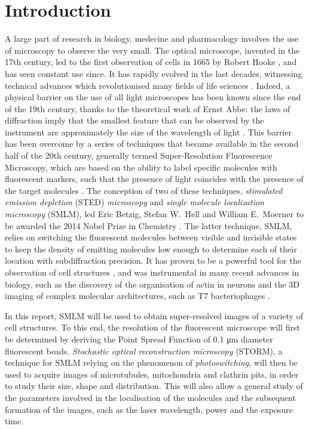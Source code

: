 \section{Introduction}
A large part of research in biology, medecine and pharmacology involves the use of microscopy to observe the very small.
The optical microscope, invented in the 17th century, led to the first observation of cells in 1665 by Robert Hooke \cite{reigoto_comparative_2021}, and has seen constant use since.
It has rapidly evolved in the last decades, witnessing technical advances which revolutionised many fields of life sciences \cite{balasubramanian_imagining_2023}.
Indeed, a physical barrier on the use of all light microscopes has been known since the end of the 19th century, thanks to the theoretical work of Ernst Abbe: the laws of diffraction imply that the smallest feature that can be observed by the instrument are approximately the size of the wavelength of light \cite{diaspro_fundamentals_2011}.
This barrier has been overcome by a series of techniques that became available in the second half of the 20th century, generally termed Super-Resolution Fluorescence Microscopy, which are based on the ability to label specific molecules with fluorescent markers, such that the presence of light coincides with the presence of the target molecules \cite{douglass_notice_2023}.
The conception of two of these techniques, \emph{stimulated emission depletion} (STED) \emph{microscopy} and \emph{single molecule localization microscopy} (SMLM), led Eric Betzig, Stefan W.~Hell and William E.~Moerner to be awarded the 2014 Nobel Prize in Chemistry \cite{nobel_press_2014}.
The latter technique, SMLM, relies on switching the fluorescent molecules between visible and invisible states to keep the density of emitting molecules low enough to determine each of their location with subdiffraction precision.
It has proven to be a powerful tool for the observation of cell structures \cite{baddeley_biological_2018}, 
and was instrumental in many recent advances in biology, such as the discovery of the organisation of actin in neurons \cite{xu_actin_2013} and the 3D imaging of complex molecular architectures, such as T7 bacteriophages \cite{huang_ultra-high_2016}.

In this report, SMLM will be used to obtain super-resolved images of a variety of cell structures.
To this end, the resolution of the fluorescent microscope will first be determined by deriving the Point Spread Function of 0.1 \unit{\micro m} diameter fluorescent beads.
\emph{Stochastic optical reconstruction microscopy} (STORM), a technique for SMLM relying on the phenomenon of \emph{photoswitching}, will then be used to acquire images of microtubules, mitochondria and clathrin pits, in order to study their size, shape and distribution.
This will also allow a general study of the parameters involved in the localisation of the molecules and the subsequent formation of the images, such as the laser wavelength, power and the exposure time.